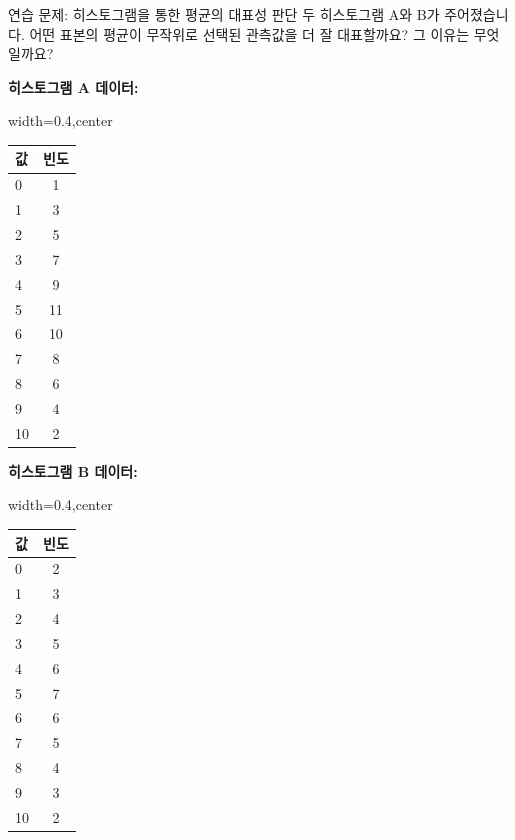 \documentclass[11pt,a4paper]{article}
\begin{document}
\begin{examplebox}{연습 문제: 히스토그램을 통한 평균의 대표성 판단}
두 히스토그램 A와 B가 주어졌습니다. 어떤 표본의 평균이 무작위로 선택된 관측값을 더 잘 대표할까요? 그 이유는 무엇일까요?

\textbf{히스토그램 A 데이터:}
\begin{adjustbox}{width=0.4\textwidth,center}
\begin{tabular}{lc}
\toprule
\textbf{값} & \textbf{빈도} \\
\midrule
0 & 1 \\
1 & 3 \\
2 & 5 \\
3 & 7 \\
4 & 9 \\
5 & 11 \\
6 & 10 \\
7 & 8 \\
8 & 6 \\
9 & 4 \\
10 & 2 \\
\bottomrule
\end{tabular}
\end{adjustbox}
\label{tab:histogram_a}

\textbf{히스토그램 B 데이터:}
\begin{adjustbox}{width=0.4\textwidth,center}
\begin{tabular}{lc}
\toprule
\textbf{값} & \textbf{빈도} \\
\midrule
0 & 2 \\
1 & 3 \\
2 & 4 \\
3 & 5 \\
4 & 6 \\
5 & 7 \\
6 & 6 \\
7 & 5 \\
8 & 4 \\
9 & 3 \\
10 & 2 \\
\bottomrule
\end{tabular}
\end{adjustbox}
\label{tab:histogram_b}


\end{examplebox}
\end{document}
